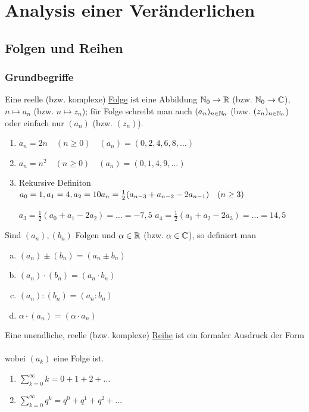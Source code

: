 \cleardoublepage
\part{Analysis einer Veränderlichen}
\chapter{Folgen und Reihen}
\section{Grundbegriffe}
\Def Eine reelle (bzw. komplexe) \ul{Folge} ist eine Abbildung $\mathbb{N}_0\to\mathbb{R}$ (bzw. $\mathbb{N}_0\to\mathbb{C}$), $n\mapsto a_n$ (bzw. $n\mapsto z_n$); für Folge schreibt man auch $(a_n)_{n\in\mathbb{N}_0}$ (bzw. $(z_n)_{n\in\mathbb{N}_0}$) oder einfach nur $(a_n)$ (bzw. $(z_n)$).

\Bsp
\begin{enumerate}
	\item $a_n = 2n \quad (n\ge0)\quad(a_n) = (0,2,4,6,8,\ldots)$
	\item $a_n = n^2 \quad (n\ge0)\quad(a_n) = (0,1,4,9,\ldots)$
	\item Rekursive Definiton\\
	$a_0 = 1, a_1 = 4, a_2 = 10\\
	a_n = \frac{1}{2}(a_{n-3}+a_{n-2}-2a_{n-1}) \quad (n\ge3)$
	
	$a_3 = \frac{1}{2}(a_0+a_1-2a_2)= \ldots = -7{,}5$
	$a_4 = \frac{1}{2}(a_1+a_2-2a_3)= \ldots = 14{,}5$
\end{enumerate}

\Def Sind $(a_n),(b_n)$ Folgen und $\alpha\in\mathbb{R}$ (bzw. $\alpha\in\mathbb{C}$), so definiert man
\begin{enumerate}[a)]
	\item $(a_n)\pm(b_n) = (a_n\pm b_n)$
	\item $(a_n)\cdot(b_n) = (a_n\cdot b_n)$
	\item $(a_n)\colon(b_n) = (a_n\colon b_n)$
	\item $\alpha\cdot(a_n) = (\alpha\cdot a_n)$
\end{enumerate}

\Def Eine unendliche, reelle (bzw. komplexe) \ul{Reihe} ist ein formaler Ausdruck der Form\\
\\
wobei $(a_k)$ eine Folge ist.

\Bsp
\begin{enumerate}
	\item $\sum\limits_{k=0}^{\infty}k = 0+1+2+\ldots$
	\item $\sum\limits_{k=0}^{\infty}q^k = q^0+q^1+q^2+\ldots$
\end{enumerate}

